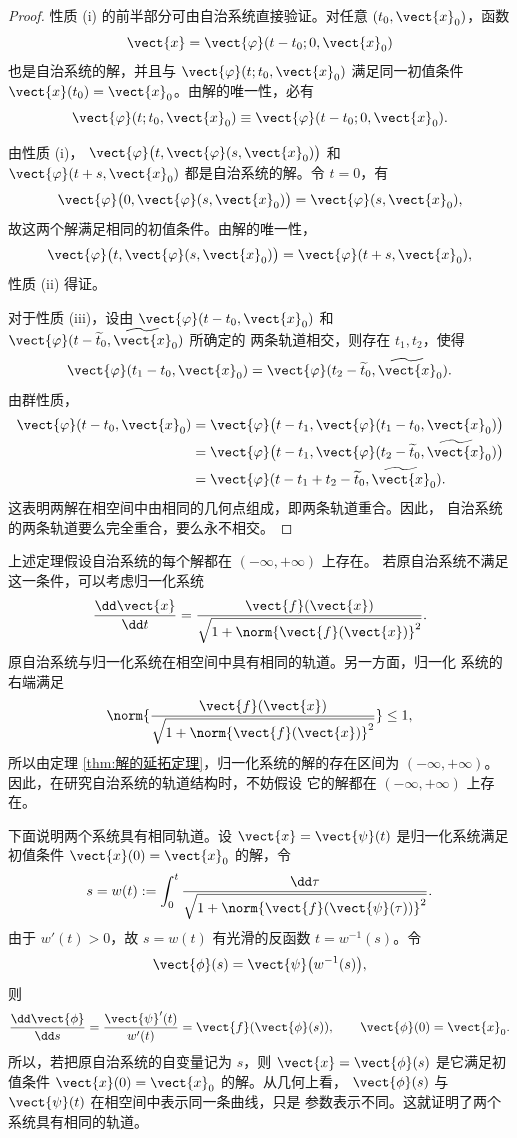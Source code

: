 \begin{proof}
	性质 \textnormal{(i)} 的前半部分可由自治系统直接验证。对任意
	$(t_0,\vect{x}_0)$，函数
	\[
		\vect{x}=\vect{\varphi}(t-t_0;0,\vect{x}_0)
	\]
	也是自治系统的解，并且与
	$\vect{\varphi}(t;t_0,\vect{x}_0)$ 满足同一初值条件
	$\vect{x}(t_0)=\vect{x}_0$。由解的唯一性，必有
	\[
		\vect{\varphi}(t;t_0,\vect{x}_0)
		\equiv\vect{\varphi}(t-t_0;0,\vect{x}_0).
	\]

	由性质 \textnormal{(i)}，
	$\vect{\varphi}\bigl(t,\vect{\varphi}(s,\vect{x}_0)\bigr)$ 和
	$\vect{\varphi}(t+s,\vect{x}_0)$ 都是自治系统的解。令 $t=0$，有
	\[
		\vect{\varphi}\bigl(0,\vect{\varphi}(s,\vect{x}_0)\bigr)
		=\vect{\varphi}(s,\vect{x}_0),
	\]
	故这两个解满足相同的初值条件。由解的唯一性，
	\[
		\vect{\varphi}\bigl(t,\vect{\varphi}(s,\vect{x}_0)\bigr)
		=\vect{\varphi}(t+s,\vect{x}_0),
	\]
	性质 \textnormal{(ii)} 得证。

	对于性质 \textnormal{(iii)}，设由
	$\vect{\varphi}(t-t_0,\vect{x}_0)$ 和
	$\vect{\varphi}(t-\widetilde{t}_0,\widetilde{\vect{x}}_0)$ 所确定的
	两条轨道相交，则存在 $t_1,t_2$，使得
	\[
		\vect{\varphi}(t_1-t_0,\vect{x}_0)
		=\vect{\varphi}(t_2-\widetilde{t}_0,\widetilde{\vect{x}}_0).
	\]
	由群性质，
	\begin{align*}
		\vect{\varphi}(t-t_0,\vect{x}_0)
		&=\vect{\varphi}\bigl(
		t-t_1,\vect{\varphi}(t_1-t_0,\vect{x}_0)
		\bigr)\\
		&=\vect{\varphi}\bigl(
		t-t_1,\vect{\varphi}(t_2-\widetilde{t}_0,
		\widetilde{\vect{x}}_0)
		\bigr)\\
		&=\vect{\varphi}
		(t-t_1+t_2-\widetilde{t}_0,\widetilde{\vect{x}}_0).
	\end{align*}
	这表明两解在相空间中由相同的几何点组成，即两条轨道重合。因此，
	自治系统的两条轨道要么完全重合，要么永不相交。
\end{proof}

上述定理假设自治系统的每个解都在 $(-\infty,+\infty)$ 上存在。
若原自治系统不满足这一条件，可以考虑归一化系统
\[
	\dfrac{\dd\vect{x}}{\dd t}
	=\dfrac{\vect{f}(\vect{x})}
	{\sqrt{1+\norm{\vect{f}(\vect{x})}^2}}.
\]
原自治系统与归一化系统在相空间中具有相同的轨道。另一方面，归一化
系统的右端满足
\[
	\norm{
	\dfrac{\vect{f}(\vect{x})}
	{\sqrt{1+\norm{\vect{f}(\vect{x})}^2}}
	}\leq1,
\]
所以由定理 \ref{thm:解的延拓定理}，归一化系统的解的存在区间为
$(-\infty,+\infty)$。因此，在研究自治系统的轨道结构时，不妨假设
它的解都在 $(-\infty,+\infty)$ 上存在。

下面说明两个系统具有相同轨道。设
$\vect{x}=\vect{\psi}(t)$ 是归一化系统满足初值条件
$\vect{x}(0)=\vect{x}_0$ 的解，令
\[
	s=w(t)\mathrel{:=}
	\int_0^t
	\dfrac{\dd\tau}
	{\sqrt{1+\norm{\vect{f}(\vect{\psi}(\tau))}^2}}.
\]
由于 $w'(t)>0$，故 $s=w(t)$ 有光滑的反函数 $t=w^{-1}(s)$。令
\[
	\vect{\phi}(s)=\vect{\psi}\bigl(w^{-1}(s)\bigr),
\]
则
\[
	\dfrac{\dd\vect{\phi}}{\dd s}
	=\dfrac{\vect{\psi}'(t)}{w'(t)}
	=\vect{f}(\vect{\phi}(s)),
	\qquad
	\vect{\phi}(0)=\vect{x}_0.
\]
所以，若把原自治系统的自变量记为 $s$，则
$\vect{x}=\vect{\phi}(s)$ 是它满足初值条件
$\vect{x}(0)=\vect{x}_0$ 的解。从几何上看，
$\vect{\phi}(s)$ 与 $\vect{\psi}(t)$ 在相空间中表示同一条曲线，只是
参数表示不同。这就证明了两个系统具有相同的轨道。

